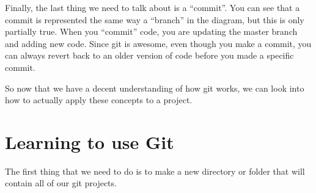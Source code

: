\documentclass[11pt,fleqn]{article}
\theoremstyle{definition}
\begin{document}
Finally, the last thing we need to talk about is a ``commit''. You can see that a commit is
represented the same way a ``branch'' in the diagram, but this is only partially true. When you
``commit'' code, you are updating the master branch and adding new code. Since git is awesome, even
though you make a commit, you can always revert back to an older version of code before you made a
specific commit. 

So now that we have a decent understanding of how git works, we can look into how to actually apply
these concepts to a project. 

\section{Learning to use Git}

The first thing that we need to do is to make a new directory or folder that will contain all of our
git projects. 

   
\end{document}
